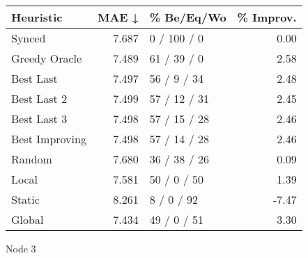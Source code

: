 \begin{tabular}{lrlr}
\toprule
\textbf{Heuristic} & \textbf{MAE ↓} & \textbf{\% Be/Eq/Wo} & \textbf{\% Improv.} \\
\midrule
            Synced &          7.687 &          0 / 100 / 0 &                0.00 \\
     Greedy Oracle &          7.489 &          61 / 39 / 0 &                2.58 \\
         Best Last &          7.497 &          56 / 9 / 34 &                2.48 \\
       Best Last 2 &          7.499 &         57 / 12 / 31 &                2.45 \\
       Best Last 3 &          7.498 &         57 / 15 / 28 &                2.46 \\
    Best Improving &          7.498 &         57 / 14 / 28 &                2.46 \\
            Random &          7.680 &         36 / 38 / 26 &                0.09 \\
             Local &          7.581 &          50 / 0 / 50 &                1.39 \\
            Static &          8.261 &           8 / 0 / 92 &               -7.47 \\
            Global &          7.434 &          49 / 0 / 51 &                3.30 \\
\bottomrule
\end{tabular}
\caption{Node 3}
\label{tab:ds_non_lr01_le1_bs4_3}
